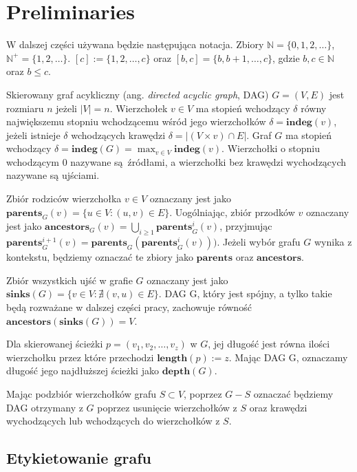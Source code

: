 \chapter{Preliminaries}
\thispagestyle{chapterBeginStyle}
\label{rozdzial1}

W dalszej części używana będzie następująca notacja.
Zbiory $\mathbb{N} = \{ 0,1,2,\dots \}$, $ \mathbb{N}^{+} = \{ 1, 2, \dots \}$.
$[c] := \{1, 2,\dots,c \}$ oraz $[b, c] = \{ b, b+1, \dots, c \}$, gdzie $b, c \in \mathbb{N}$ oraz $b \leq c$.

Skierowany graf acykliczny (ang. \textit{directed acyclic graph}, DAG) $G = (V, E)$ jest rozmiaru $n$ jeżeli $|V| = n$.
Wierzchołek $v \in V$ ma stopień wchodzący $\delta$ równy największemu stopniu wchodzącemu wśród jego wierzchołków $\delta = \mathbf{indeg}(v)$, jeżeli istnieje $\delta$ wchodzących krawędzi $\delta = | \left( V \times {v} \right) \cap E|$.
Graf $G$ ma stopień wchodzący $ \delta = \mathbf{indeg}(G) = \max_{v \in V} \mathbf{indeg}(v)$.
Wierzchołki o stopniu wchodzącym 0 nazywane są źródłami, a wierzchołki bez krawędzi wychodzących nazywane są ujściami.

Zbiór rodziców wierzchołka $v \in V$ oznaczany jest jako $\mathbf{parents}_{G}(v) = \{ u \in V: (u, v) \in E \}$.
Uogólniając, zbiór przodków $v$ oznaczany jest jako $\mathbf{ancestors}_{G}(v) = \bigcup_{i \geq 1}\mathbf{parents}_{G}^{i}(v)$, przyjmując $\mathbf{parents}_{G}^{i+1}(v) = \mathbf{parents}_{G}(\mathbf{parents}_{G}^{i}(v)))$. Jeżeli wybór grafu $G$ wynika z kontekstu, będziemy oznaczać te zbiory jako $\mathbf{parents}$ oraz $\mathbf{ancestors}$.

Zbiór wszystkich ujść w grafie $G$ oznaczany jest jako $\mathbf{sinks}(G) = \{ v \in V : \nexists (v, u) \in E \}$. DAG G, który jest spójny, a tylko takie będą rozważane w dalszej części pracy, zachowuje równość $\mathbf{ancestors}(\mathbf{sinks}(G)) = V$.

Dla skierowanej ścieżki $p = (v_{1},v_{2},\dots,v_{z})$ w $G$, jej długość jest równa ilości wierzchołku przez które przechodzi $\mathbf{length}(p) := z$.
Mając DAG G, oznaczamy długość jego najdłuższej ścieżki jako $\mathbf{depth}(G)$.

Mając podzbiór wierzchołków grafu $S \subset V$, poprzez $G - S$ oznaczać będziemy DAG otrzymany z $G$ poprzez usunięcie wierzchołków z $S$ oraz krawędzi wychodzących lub wchodzących do wierzchołków z $S$.

\section{Etykietowanie grafu}

